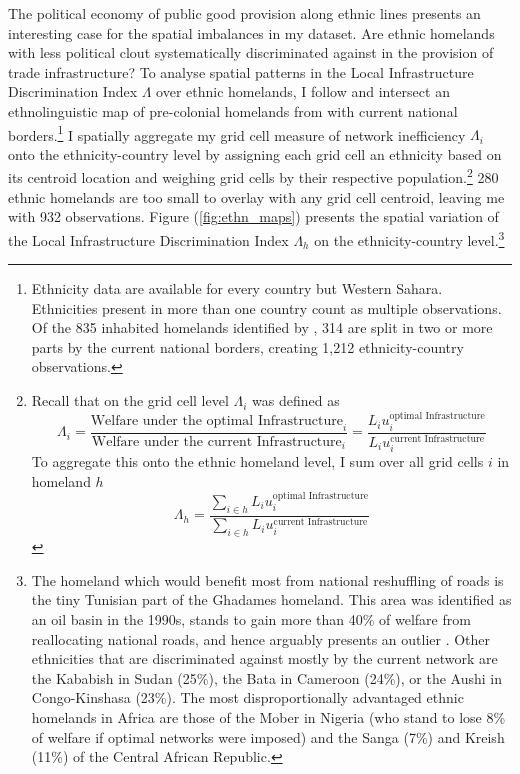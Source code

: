 \documentclass[11pt, oneside]{article}   	%
\let\oldref\ref
\renewcommand{\ref}[1]{(\oldref{#1})}
\begin{document}
The political economy of public good provision along ethnic lines presents an interesting case for the spatial imbalances in my dataset. Are ethnic homelands with less political clout systematically discriminated against in the provision of trade infrastructure? To analyse spatial patterns in the Local Infrastructure Discrimination Index $\Lambda$ over ethnic homelands, I follow \cite{Michalopoulos_PreColonialEthnicInstitutions_2013,Michalopoulos_NationalInstitutionsSubnational_2014,Michalopoulos_LongRunEffectsScramble_2016} and intersect an ethnolinguistic map of pre-colonial homelands from \cite{Murdock_Africaitspeoples_1959} with current national borders.\footnote{Ethnicity data are available for every country but Western Sahara. Ethnicities present in more than one country count as multiple observations. Of the 835 inhabited homelands identified by \citeauthor{Murdock_Africaitspeoples_1959}, 314 are split in two or more parts by the current national borders, creating 1,212 ethnicity-country observations.} I spatially aggregate my grid cell measure of network inefficiency $\Lambda_{i}$ onto the ethnicity-country level by assigning each grid cell an ethnicity based on its centroid location and weighing grid cells by their respective population.\footnote{Recall that on the grid cell level $\Lambda_{i}$ was defined as \begin{equation*}
  \Lambda_{i} = \frac{\textrm{Welfare under the optimal Infrastructure}_{i}}{\textrm{Welfare under the current Infrastructure}_{i}} = \frac{L_{i}u_{i}^{\textrm{optimal Infrastructure}}}{L_{i}u_{i}^{\textrm{current Infrastructure}}}
\end{equation*} To aggregate this onto the ethnic homeland level, I sum over all grid cells $i$ in homeland $h$ \begin{equation*}
  \Lambda_{h} = \frac{\sum_{i \in h}^{} L_{i}u_{i}^{\textrm{optimal Infrastructure}}}{\sum_{i \in h}^{}L_{i}u_{i}^{\textrm{current Infrastructure}}}
\end{equation*}} 280 ethnic homelands are too small to overlay with any grid cell centroid, leaving me with 932 observations. Figure \ref{fig:ethn_maps} presents the spatial variation of the Local Infrastructure Discrimination Index $\Lambda_{h}$ on the ethnicity-country level.\footnote{The homeland which would benefit most from national reshuffling of roads is the tiny Tunisian part of the Ghadames homeland. This area was identified as an oil basin in the 1990s, stands to gain more than 40\% of welfare from reallocating national roads, and hence arguably presents an outlier \citep{Echikh_Geologyhydrocarbonoccurrences_1998}. Other ethnicities that are discriminated against mostly by the current network are the Kababish in Sudan (25\%), the Bata in Cameroon (24\%), or the Aushi in Congo-Kinshasa (23\%). The most disproportionally advantaged ethnic homelands in Africa are those of the Mober in Nigeria (who stand to lose 8\% of welfare if optimal networks were imposed) and the Sanga (7\%) and Kreish (11\%) of the Central African Republic.}
\end{document}
